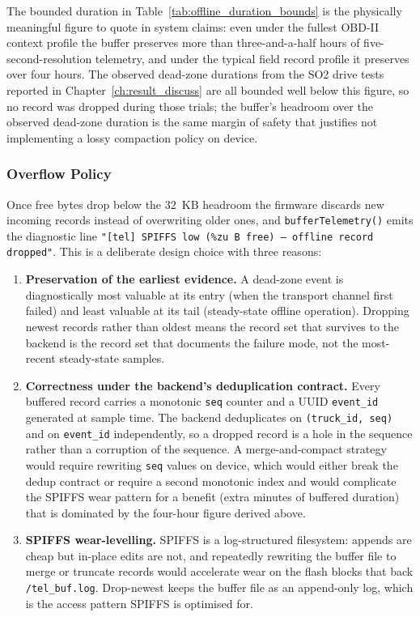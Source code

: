 The bounded duration in Table~\ref{tab:offline_duration_bounds} is the physically meaningful figure to quote in system claims: even under the fullest OBD-II context profile the buffer preserves more than three-and-a-half hours of five-second-resolution telemetry, and under the typical field record profile it preserves over four hours. The observed dead-zone durations from the SO2 drive tests reported in Chapter~\ref{ch:result_discuss} are all bounded well below this figure, so no record was dropped during those trials; the buffer's headroom over the observed dead-zone duration is the same margin of safety that justifies not implementing a lossy compaction policy on device.

\subsubsection{Overflow Policy}
\label{sec:offline_overflow_policy}

Once free bytes drop below the $32$~KB headroom the firmware discards new incoming records instead of overwriting older ones, and \texttt{bufferTelemetry()} emits the diagnostic line \texttt{"[tel] SPIFFS low (\%zu B free) --- offline record dropped"}. This is a deliberate design choice with three reasons:

\begin{enumerate}[label=\textbf{(\alph*)}, leftmargin=*]
\item \textbf{Preservation of the earliest evidence.} A dead-zone event is diagnostically most valuable at its entry (when the transport channel first failed) and least valuable at its tail (steady-state offline operation). Dropping newest records rather than oldest means the record set that survives to the backend is the record set that documents the failure mode, not the most-recent steady-state samples.

\item \textbf{Correctness under the backend's deduplication contract.} Every buffered record carries a monotonic \texttt{seq} counter and a UUID \texttt{event\_id} generated at sample time. The backend deduplicates on \texttt{(truck\_id, seq)} and on \texttt{event\_id} independently, so a dropped record is a hole in the sequence rather than a corruption of the sequence. A merge-and-compact strategy would require rewriting \texttt{seq} values on device, which would either break the dedup contract or require a second monotonic index and would complicate the SPIFFS wear pattern for a benefit (extra minutes of buffered duration) that is dominated by the four-hour figure derived above.

\item \textbf{SPIFFS wear-levelling.} SPIFFS is a log-structured filesystem: appends are cheap but in-place edits are not, and repeatedly rewriting the buffer file to merge or truncate records would accelerate wear on the flash blocks that back \texttt{/tel\_buf.log}. Drop-newest keeps the buffer file as an append-only log, which is the access pattern SPIFFS is optimised for.
\end{enumerate}

